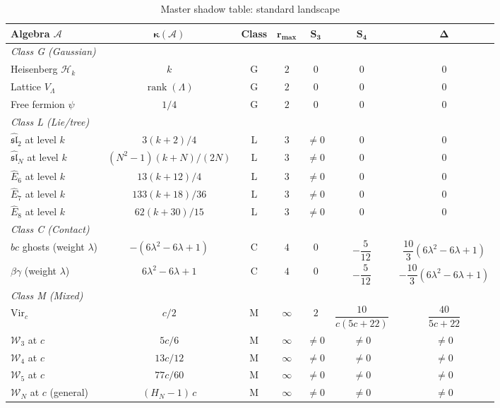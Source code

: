 \documentclass[11pt]{article}
\theoremstyle{plain}
\theoremstyle{definition}
\theoremstyle{remark}
\providecommand{\cA}{\mathcal{A}}
\providecommand{\cH}{\mathcal{H}}
\providecommand{\cW}{\mathcal{W}}
\begin{document}
\begin{table}[ht]
\centering
\caption{Master shadow table: standard landscape}
\label{tab:master-shadow}
\renewcommand{\arraystretch}{1.35}
{\small
\begin{tabular}{lcccccc}
\toprule
\textbf{Algebra $\cA$}
 & $\boldsymbol{\kappa(\cA)}$
 & \textbf{Class}
 & $\boldsymbol{r_{\max}}$
 & $\boldsymbol{S_3}$
 & $\boldsymbol{S_4}$
 & $\boldsymbol{\Delta}$ \\
\midrule
\multicolumn{7}{l}{\textit{Class G (Gaussian)}} \\[2pt]
Heisenberg $\cH_k$
 & $k$
 & G & $2$ & $0$ & $0$ & $0$ \\
Lattice $V_\Lambda$
 & $\operatorname{rank}(\Lambda)$
 & G & $2$ & $0$ & $0$ & $0$ \\
Free fermion $\psi$
 & $1/4$
 & G & $2$ & $0$ & $0$ & $0$ \\[3pt]
\midrule
\multicolumn{7}{l}{\textit{Class L (Lie/tree)}} \\[2pt]
$\widehat{\mathfrak{sl}}_2$ at level $k$
 & $3(k{+}2)/4$
 & L & $3$
 & $\neq 0$ & $0$ & $0$ \\
$\widehat{\mathfrak{sl}}_N$ at level $k$
 & $(N^2{-}1)(k{+}N)/(2N)$
 & L & $3$
 & $\neq 0$ & $0$ & $0$ \\
$\widehat{E}_6$ at level $k$
 & $13(k{+}12)/4$
 & L & $3$
 & $\neq 0$ & $0$ & $0$ \\
$\widehat{E}_7$ at level $k$
 & $133(k{+}18)/36$
 & L & $3$
 & $\neq 0$ & $0$ & $0$ \\
$\widehat{E}_8$ at level $k$
 & $62(k{+}30)/15$
 & L & $3$
 & $\neq 0$ & $0$ & $0$ \\[3pt]
\midrule
\multicolumn{7}{l}{\textit{Class C (Contact)}} \\[2pt]
$bc$ ghosts (weight $\lambda$)
 & $-(6\lambda^2{-}6\lambda{+}1)$
 & C & $4$
 & $0$ & $-\dfrac{5}{12}$
 & $\dfrac{10}{3}(6\lambda^2{-}6\lambda{+}1)$ \\
$\beta\gamma$ (weight $\lambda$)
 & $6\lambda^2{-}6\lambda{+}1$
 & C & $4$
 & $0$ & $-\dfrac{5}{12}$
 & $-\dfrac{10}{3}(6\lambda^2{-}6\lambda{+}1)$ \\[3pt]
\midrule
\multicolumn{7}{l}{\textit{Class M (Mixed)}} \\[2pt]
$\mathrm{Vir}_c$
 & $c/2$
 & M & $\infty$
 & $2$
 & $\dfrac{10}{c(5c{+}22)}$
 & $\dfrac{40}{5c{+}22}$ \\[8pt]
$\cW_3$ at $c$
 & $5c/6$
 & M & $\infty$
 & $\neq 0$ & $\neq 0$ & $\neq 0$ \\
$\cW_4$ at $c$
 & $13c/12$
 & M & $\infty$
 & $\neq 0$ & $\neq 0$ & $\neq 0$ \\
$\cW_5$ at $c$
 & $77c/60$
 & M & $\infty$
 & $\neq 0$ & $\neq 0$ & $\neq 0$ \\
$\cW_N$ at $c$ (general)
 & $(H_N{-}1)\,c$
 & M & $\infty$
 & $\neq 0$ & $\neq 0$ & $\neq 0$ \\
\bottomrule
\end{tabular}
}
\end{table}
\end{document}
